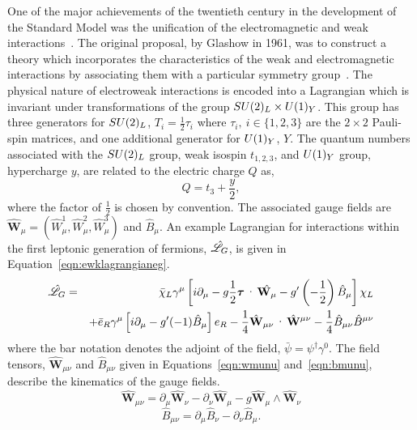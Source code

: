 One of the major achievements of the twentieth century in 
the development of the Standard Model was the unification of the electromagnetic 
and weak interactions~\citep{glashow,weinberg,salam}. 
The original proposal, by Glashow in 1961, was
to construct a theory which incorporates the characteristics of 
the weak and electromagnetic interactions by associating them 
with a particular symmetry group~\citep{glashow}.
The physical nature of electroweak interactions is encoded into a Lagrangian which 
is invariant under transformations of the group $SU(2)_{L}\times U(1)_{Y}$. 
This group has three generators for $SU(2)_{L}$, $T_{i} = \frac{1}{2}\tau_{i}$ 
where $\tau_{i},~i\in \{1,2,3 \}$ are the $2\times2$ Pauli-spin matrices, and one
additional generator for $U(1)_{Y}$, $Y$.
The quantum numbers associated with the $SU(2)_{L}$ group, weak isospin $t_{1,2,3}$, and 
$U(1)_{Y}$ group, hypercharge $y$, are related to the electric charge $Q$ as,
\begin{equation}
Q = t_{3}+\frac{y}{2},
\end{equation} 
where the factor of $\frac{\displaystyle 1}{\displaystyle 2}$ is chosen by convention.
The associated gauge fields are 
$\hat{\mathbf{W}}_{\mu} = \left(\hat{W}_{\mu}^{1},\hat{W}_{\mu}^{2},\hat{W}_{\mu}^{3}\right)$
 and $\hat{B}_{\mu}$.
An example Lagrangian for interactions within the first leptonic generation of fermions, $\hat{\mathscr{L}}_{G}$, is 
given in Equation~\ref{eqn:ewklagrangianeg}.
\begin{eqnarray}
\lagr_{G} & =& \bar{\chi}_{L}\gamma^{\mu}\left[i\partial_{\mu} 
		   - g\frac{1}{2}\boldsymbol{\tau}\cdot\hat{\mathbf{W}_{\mu}}
		   - g^{\prime}\left(-\frac{1}{2}\right)\hat{B}_{\mu}\right] \chi_{L}
\nonumber \\
& &		   + \bar{e}_{R}\gamma^{\mu}\left[i\partial_{\mu} 
		   - g^{\prime}(-1)\hat{B}_{\mu}\right]{e}_{R}
		     -\frac{1}{4}
		     \hat{\mathbf{W}}_{\mu\nu}\cdot\hat{\mathbf{W}}^{\mu\nu} 
		     -\frac{1}{4}
		     \hat{B}_{\mu\nu}\hat{B}^{\mu\nu}
\label{eqn:ewklagrangianeg}
\end{eqnarray}
where the bar notation denotes the adjoint of the field, $\bar{\psi}=\psi^{\dagger}\gamma^{0}$.
The field tensors, $\hat{\mathbf{W}}_{\mu\nu}$ and $\hat{B}_{\mu\nu}$ given in 
Equations~\ref{eqn:wmunu} and~\ref{eqn:bmunu},
describe the kinematics of the gauge fields.
\begin{equation}
\hat{\mathbf{W}}_{\mu\nu} = \partial_{\mu}\hat{\mathbf{W}}_{\nu} - \partial_{\nu}\hat{\mathbf{W}}_{\mu} - g \hat{\mathbf{W}}_{\mu}\wedge\hat{\mathbf{W}}_{\nu}
\label{eqn:wmunu}
\end{equation}
\begin{equation}
\hat{B}_{\mu\nu} = \partial_{\mu}\hat{B}_{\nu} - \partial_{\nu}\hat{B}_{\mu}.
\label{eqn:bmunu}
\end{equation}


